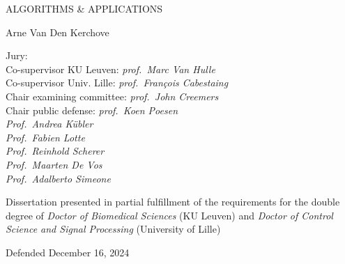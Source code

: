 {{\begin{minipage}{\textwidth}
      \MakeUppercase{%
        \Large
        Algorithms \& Applications
      }
      \bigskip

      {%
        \Large
        Arne  Van Den Kerchove
      }

    \end{minipage}%
  }

  \vfill
  \begin{minipage}[b]{.6\textwidth}
    \raggedright
    Jury: \\
    Co-supervisor KU Leuven: \emph{prof.\ Marc Van Hulle} \\
    Co-supervisor Univ. Lille: \emph{prof.\ François Cabestaing} \\
    Chair examining committee: \emph{prof.\ John Creemers} \\
    Chair public defense: \emph{prof.\ Koen Poesen} \\
    \emph{Prof.\ Andrea K\"ubler} \\
    \emph{Prof.\ Fabien Lotte} \\
    \emph{Prof.\ Reinhold Scherer} \\
    \emph{Prof.\ Maarten De Vos} \\
    \emph{Prof.\ Adalberto Simeone}
  \end{minipage}\hfill%
  \begin{minipage}[b]{.31\textwidth}
      \raggedright
      Dissertation presented in partial fulfillment of the requirements for
      the double degree of \emph{Doctor of Biomedical Sciences} (KU Leuven)
      and \emph{Doctor of Control Science and Signal Processing} (University
      of Lille)
  \end{minipage}
  \bigskip

  \centering
  \hfill Defended December 16, 2024\hfill
}
